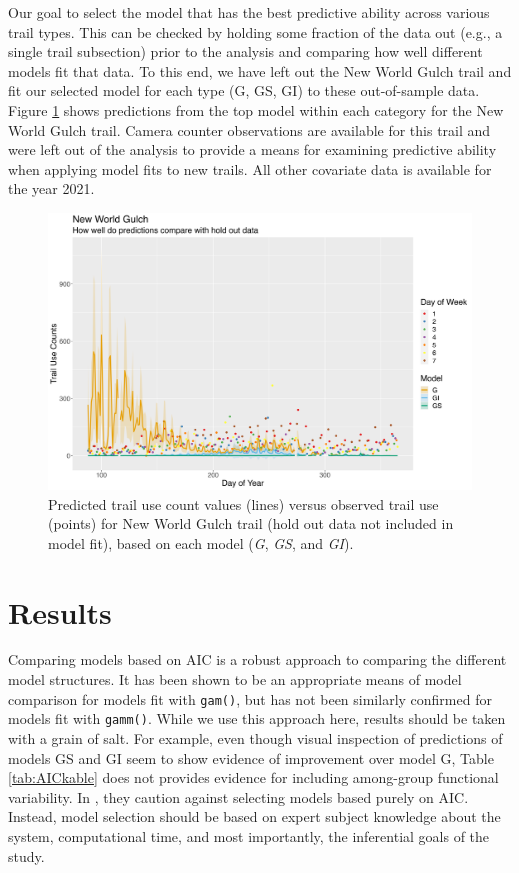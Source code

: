 \documentclass[
]{book}
\begin{document}
Our goal to select the model that has the best predictive ability across various trail types. This can be checked by holding some fraction of the data out (e.g., a single trail subsection) prior to the analysis and comparing how well different models fit that data. To this end, we have left out the New World Gulch trail and fit our selected model for each type (G, GS, GI) to these out-of-sample data. Figure \ref{fig:NWG-pred} shows predictions from the top model within each category for the New World Gulch trail. Camera counter observations are available for this trail and were left out of the analysis to provide a means for examining predictive ability when applying model fits to new trails. All other covariate data is available for the year 2021.

\begin{figure}

{\centering \includegraphics[width=1\linewidth]{../figures/NWG_pred_compare} 

}

\caption{Predicted trail use count values (lines) versus observed trail use (points) for New World Gulch trail (hold out data not included in model fit), based on each model (\emph{G}, \emph{GS}, and \emph{GI}).}\label{fig:NWG-pred}
\end{figure}

\hypertarget{results}{%
\section{Results}\label{results}}

Comparing models based on AIC is a robust approach to comparing the different model structures. It has been shown to be an appropriate means of model comparison for models fit with \texttt{gam()}, but has not been similarly confirmed for models fit with \texttt{gamm()}. While we use this approach here, results should be taken with a grain of salt. For example, even though visual inspection of predictions of models GS and GI seem to show evidence of improvement over model G, Table \ref{tab:AICkable} does not provides evidence for including among-group functional variability. In \citet{pedersen2019hierarchical}, they caution against selecting models based purely on AIC. Instead, model selection should be based on expert subject knowledge about the system, computational time, and most importantly, the inferential goals of the study.
\end{document}

